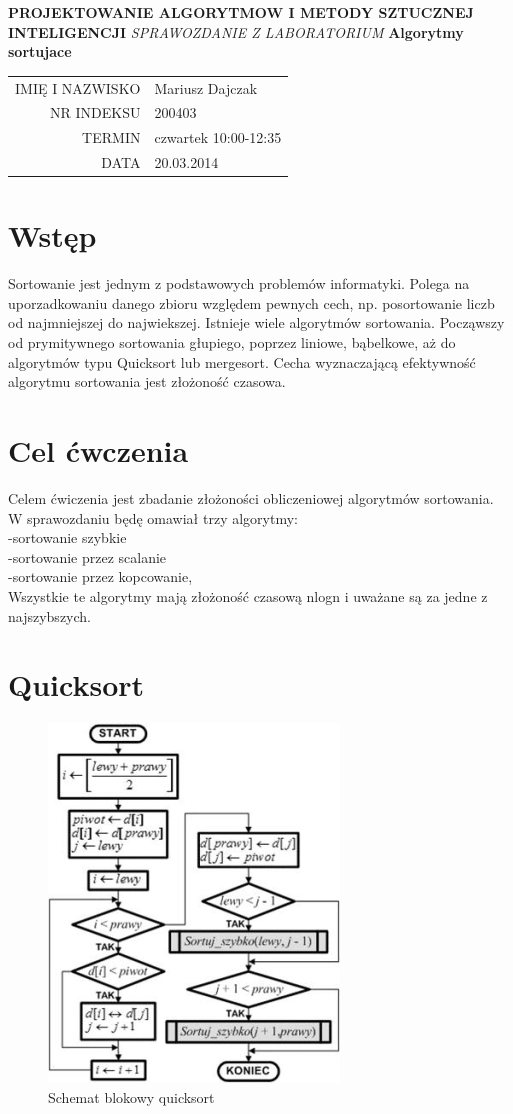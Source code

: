 \documentclass[12pt,oneside]{mwbk}
\renewcommand {\maketitle}{
\begin {titlepage}
\begin {center}
	\LARGE
	\textbf {PROJEKTOWANIE ALGORYTMOW I METODY SZTUCZNEJ INTELIGENCJI}
	\newline
	\newline
	\textit {SPRAWOZDANIE Z  LABORATORIUM}
	\textbf{ Algorytmy sortujace}
	\newline
	\begin{table}
	\begin{center}
	\begin{tabular}{rl}
	IMIĘ I NAZWISKO & Mariusz Dajczak \\
	NR INDEKSU & 200403 \\	
	TERMIN & czwartek 10:00-12:35 \\
	DATA  & 20.03.2014 \\
	\end{tabular}

	\end{center}
	\end{table}
\end {center}
\end {titlepage}}
\begin{document}
\maketitle
\section{Wstęp}
	\indent Sortowanie jest jednym z podstawowych problemów informatyki. Polega na uporzadkowaniu danego zbioru względem 			pewnych cech, np. posortowanie liczb od najmniejszej do najwiekszej. Istnieje wiele algorytmów sortowania. Począwszy od 			prymitywnego sortowania głupiego, poprzez liniowe, bąbelkowe, aż do algorytmów typu Quicksort lub mergesort. Cecha 			wyznaczającą efektywność algorytmu sortowania jest złożoność czasowa. \\
	
\section {Cel ćwczenia}
	\indent Celem ćwiczenia jest zbadanie złożoności obliczeniowej algorytmów sortowania. W sprawozdaniu będę omawiał trzy 			algorytmy:\\
	\indent-sortowanie szybkie\\
	\indent-sortowanie przez scalanie\\
	\indent-sortowanie przez kopcowanie,\\
	Wszystkie te algorytmy mają złożoność czasową nlogn i uważane są za jedne z najszybszych. 
\section {Quicksort}
	\begin{figure}[h]
	\centering
	\includegraphics[scale=0.3]{rys/quick.jpg}
	\caption{Schemat blokowy quicksort}
	\end{figure}
\end{document}
